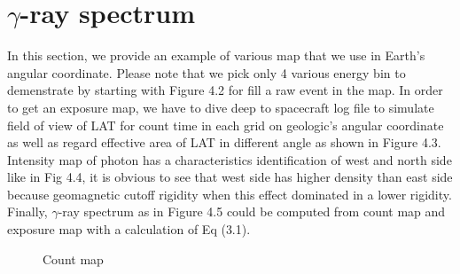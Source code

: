 \section{$\gamma$-ray spectrum}
In this section, we provide an example of various map that we use in Earth's angular coordinate. Please note that we pick only 4 various energy bin to demenstrate by starting with Figure 4.2 for fill a raw event in the map. 
In order to get an exposure map, we have to dive deep to spacecraft log file to simulate field of view of LAT for count time in each grid on geologic's angular coordinate as well as regard effective area of LAT in different angle as shown in Figure 4.3. Intensity map of photon has a characteristics identification of west and north side like in Fig 4.4, it is obvious to see that west side has higher density than east side because geomagnetic cutoff rigidity when this effect dominated in a lower rigidity.
Finally, $\gamma$-ray spectrum as in Figure 4.5 could be computed from count map and exposure map with a calculation of Eq (3.1).
\begin{figure}[h!]
    \caption{Count map}
\end{figure}


